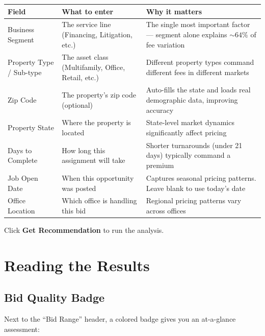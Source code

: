 \documentclass[12pt,a4paper]{article}
\begin{document}
\begin{tabularx}{\textwidth}{l >{\raggedright\arraybackslash}X >{\raggedright\arraybackslash}X}
    \toprule
    \textbf{Field} & \textbf{What to enter} & \textbf{Why it matters} \\
    \midrule
    Business Segment & The service line (Financing, Litigation, etc.)
        & The single most important factor --- segment alone explains ${\sim}64\%$ of fee variation \\[0.5em]
    Property Type / Sub-type & The asset class (Multifamily, Office, Retail, etc.)
        & Different property types command different fees in different markets \\[0.5em]
    Zip Code & The property's zip code (optional)
        & Auto-fills the state and loads real demographic data, improving accuracy \\[0.5em]
    Property State & Where the property is located
        & State-level market dynamics significantly affect pricing \\[0.5em]
    Days to Complete & How long this assignment will take
        & Shorter turnarounds (under 21 days) typically command a premium \\[0.5em]
    Job Open Date & When this opportunity was posted
        & Captures seasonal pricing patterns. Leave blank to use today's date \\[0.5em]
    Office Location & Which office is handling this bid
        & Regional pricing patterns vary across offices \\
    \bottomrule
\end{tabularx}

\vspace{0.5em}
Click \textbf{Get Recommendation} to run the analysis.

\section{Reading the Results}

\subsection{Bid Quality Badge}

Next to the ``Bid Range'' header, a colored badge gives you an at-a-glance assessment:
\end{document}
